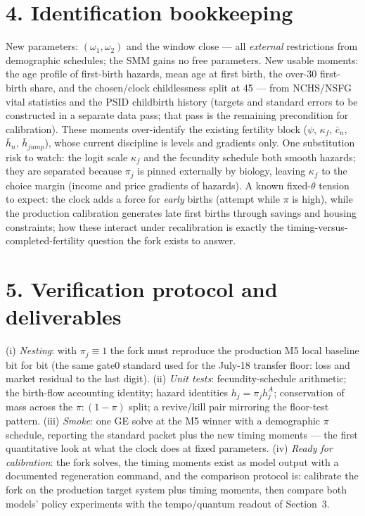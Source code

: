 \documentclass[11pt]{article}
\begin{document}
\section*{4. Identification bookkeeping}

New parameters: $(\omega_1,\omega_2)$ and the window close --- all
\emph{external} restrictions from demographic schedules; the SMM gains no
free parameters. New usable moments: the age profile of first-birth hazards, mean age at
first birth, the over-30 first-birth share, and the chosen/clock
childlessness split at 45 --- from NCHS/NSFG vital statistics and the PSID
childbirth history (targets and standard errors to be constructed in a
separate data pass; that pass is the remaining precondition for
calibration). These moments over-identify the existing fertility block
($\psi$, $\kappa_f$, $\bar c_n$, $\bar h_n$, $\bar h_{jump}$), whose
current discipline is levels and gradients only. One substitution risk to
watch: the logit scale $\kappa_f$ and the fecundity schedule both smooth
hazards; they are separated because $\pi_j$ is pinned externally by
biology, leaving $\kappa_f$ to the choice margin (income and price
gradients of hazards). A known fixed-$\theta$ tension to expect: the clock
adds a force for \emph{early} births (attempt while $\pi$ is high), while
the production calibration generates late first births through savings and
housing constraints; how these interact under recalibration is exactly the
timing-versus-completed-fertility question the fork exists to answer.

\section*{5. Verification protocol and deliverables}

(i) \emph{Nesting}: with $\pi_j \equiv 1$ the fork must reproduce the
production M5 local baseline bit for bit (the same gate0 standard used for
the July-18 transfer floor: loss and market residual to the last digit).
(ii) \emph{Unit tests}: fecundity-schedule arithmetic; the birth-flow
accounting identity; hazard identities $h_j=\pi_j h^A_j$; conservation of
mass across the $\pi:(1-\pi)$ split; a revive/kill pair mirroring the
floor-test pattern. (iii) \emph{Smoke}: one GE solve at the M5 winner with
a demographic $\pi$ schedule, reporting the standard packet plus the new
timing moments --- the first quantitative look at what the clock does at
fixed parameters. (iv) \emph{Ready for calibration}: the fork solves, the
timing moments exist as model output with a documented regeneration
command, and the comparison protocol is: calibrate the fork on the
production target system plus timing moments, then compare both models'
policy experiments with the tempo/quantum readout of Section~3.
\end{document}
